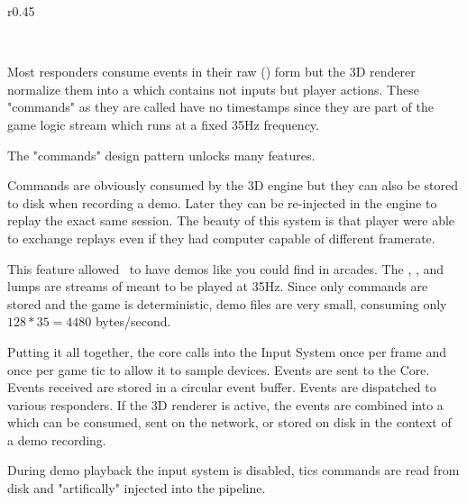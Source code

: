\begin{wrapfigure}[12]{r}{0.45\textwidth}
\centering
{}
\end{wrapfigure}
\\
\par
Most responders consume events in their raw () form but the 3D renderer normalize them into a  which contains not inputs but player actions. These "commands" as they are called have no timestamps since they are part of the game logic stream which runs at a fixed 35Hz frequency. \\
\par
{} \label{cmd_t_type}
\par
The "commands" design pattern unlocks many features. \\
\par
Commands are obviously consumed by the 3D engine but they can also be stored to disk when recording a demo. Later they can be re-injected in the engine to replay the exact same session. The beauty of this system is that player were able to exchange replays even if they had computer capable of different framerate.\\
\par
This feature allowed \doom~to have demos like you could find in arcades. The , , and  lumps are streams of  meant to be played at 35Hz. Since only commands are stored and the game is deterministic, demo files are very small, consuming only $ 128 * 35 = 4480 $ bytes/second.\\

\par
Putting it all together,  the core calls into the Input System once per frame and once per game tic to allow it to sample devices.  Events are sent to the Core.  Events received are stored in a circular event buffer.  Events are dispatched to various responders. If the 3D renderer is active, the events are combined into a  which can be consumed, sent on the network, or stored on disk in the context of a demo recording.\\
\par
 During demo playback the input system is disabled, tics commands are read from disk and "artifically" injected into the pipeline.